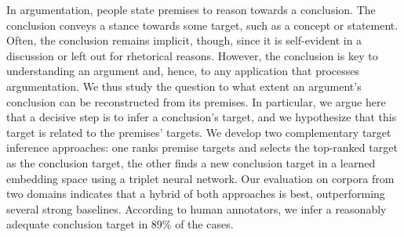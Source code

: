 In argumentation, people state premises to reason towards a conclusion. The conclusion conveys a stance towards some target, such as a concept or statement. Often, the conclusion remains implicit, though, since it is self-evident in a discussion or left out for rhetorical reasons. However, the conclusion is key to understanding an argument and, hence, to any application that processes argumentation. We thus study the question to what extent an argument's conclusion can be reconstructed from its premises. In particular, we argue here that a decisive step is to infer a conclusion's target, and we hypothesize that this target is related to the premises' targets. We develop two complementary target inference approaches: one ranks premise targets and selects the top-ranked target as the conclusion target, the other finds a new conclusion target in a learned embedding space using a triplet neural network. Our evaluation on corpora from two domains indicates that a hybrid of both approaches is best, outperforming several strong baselines. According to human annotators, we infer a reasonably adequate conclusion target in 89\% of the cases.
